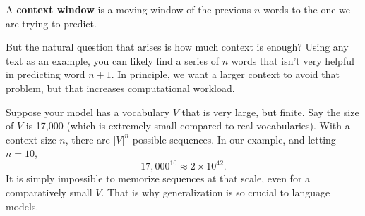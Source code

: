 \documentclass[titlepage, 12pt, leqno]{article}
\begin{document}
\begin{definition}
    A \textbf{context window} is a moving window of the previous $n$ words to 
    the one we are trying to predict.
\end{definition}

But the natural question that arises is how much context is enough? Using any
text as an example, you can likely find a series of $n$ words that isn't very 
helpful in predicting word $n+1$. In principle, we want a larger context to
avoid that problem, but that increases computational workload.

Suppose your model has a vocabulary $V$ that is very large, but finite. Say
the size of $V$ is 17,000 (which is extremely small compared to real
vocabularies). With a context size $n$, there are $|V|^{n}$ possible sequences.
In our example, and letting $n=10$,
\[
17,000^{10} \approx 2\times 10^{42}.
\]
It is simply impossible to memorize sequences at that scale, even for a
comparatively small $V$. That is why generalization is so crucial to language
models.
\end{document}
